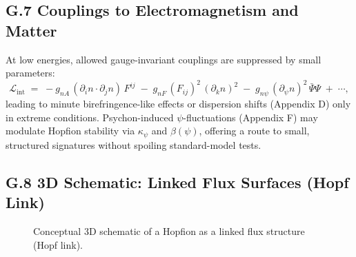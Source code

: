 \documentclass[12pt,a4paper]{article}
\begin{document}
\subsection*{G.7 Couplings to Electromagnetism and Matter}
At low energies, allowed gauge-invariant couplings are suppressed by small parameters:
\begin{equation}
\mathcal{L}_{\mathrm{int}} \;=\; - g_{nA}\, ( \partial_i n \cdot \partial_j n )\, F^{ij} \;-\; g_{nF}\, (F_{ij})^2\, ( \partial_k n )^2 \;-\; g_{n\psi}\, (\partial_\psi n)^2\, \bar{\Psi}\Psi \;+\; \cdots,
\end{equation}
leading to minute birefringence-like effects or dispersion shifts (Appendix D) only in extreme conditions. 
Psychon-induced $\psi$-fluctuations (Appendix F) may modulate Hopfion stability via $\kappa_\psi$ and $\beta(\psi)$, offering a route to small, structured signatures without spoiling standard-model tests.

\subsection*{G.8 3D Schematic: Linked Flux Surfaces (Hopf Link)}
\begin{figure}[h!]
\centering
{}
\caption{Conceptual 3D schematic of a Hopfion as a linked flux structure (Hopf link).}
\label{fig:hopf_link}
\end{figure}
\end{document}
